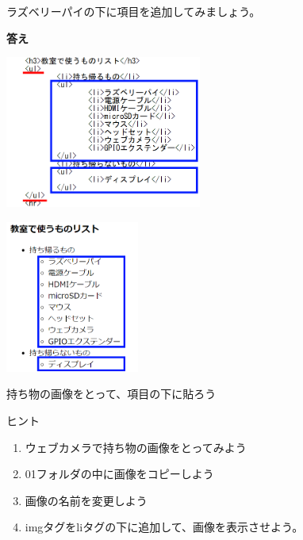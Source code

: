 \documentclass[a4paper,12pt]{jarticle}
\begin{document}
ラズベリーパイの下に項目を追加してみましょう。


\bigskip


\clearpage\flushleft
\textbf{答え}


\bigskip

\centering
\begin{minipage}{0.45\linewidth}
  \includegraphics[width=\linewidth,height=5cm]{textbook-img1043.png}
\end{minipage}
\hfill
\vspace{20pt}
\begin{minipage}{0.45\linewidth}
  \includegraphics[width=\linewidth,height=5cm]{textbook-img1044.png}
\end{minipage}

\bigskip
\flushleft

\theQuestion\label{Q:hasAnswer04-11}

持ち物の画像をとって、項目の下に貼ろう

ヒント

\begin{enumerate}
  \item
        ウェブカメラで持ち物の画像をとってみよう
  \item
        01フォルダの中に画像をコピーしよう
  \item 画像の名前を変更しよう
  \item
        imgタグをliタグの下に追加して、画像を表示させよう。
\end{enumerate}

\bigskip


\clearpage
\end{document}
